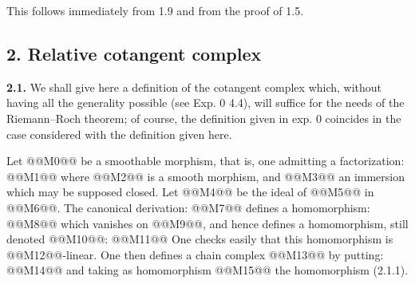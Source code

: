This follows immediately from 1.9 and from the proof of 1.5.

\subsection*{2. Relative cotangent complex}

\textbf{2.1.} We shall give here a definition of the cotangent complex which, without having all the generality possible (see Exp. 0 4.4), will suffice for the needs of the Riemann--Roch theorem; of course, the definition given in exp. 0 coincides in the case considered with the definition given here.

Let @@M0@@ be a smoothable morphism, that is, one admitting a factorization:
@@M1@@
where @@M2@@ is a smooth morphism, and @@M3@@ an immersion which may be supposed closed. Let @@M4@@ be the ideal of @@M5@@ in @@M6@@. The canonical derivation:
@@M7@@
defines a homomorphism:
@@M8@@
which vanishes on @@M9@@, and hence defines a homomorphism, still denoted @@M10@@:
@@M11@@
One checks easily that this homomorphism is @@M12@@-linear. One then defines a chain complex @@M13@@ by putting:
@@M14@@
and taking as homomorphism @@M15@@ the homomorphism (2.1.1).
